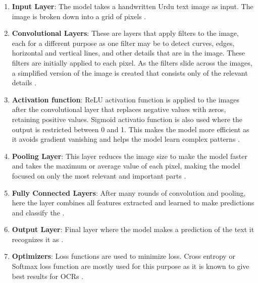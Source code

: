 \documentclass[11pt,twocolumn,twoside]{article} %
\begin{document}
\begin{enumerate}
    \item \textbf{Input Layer}: The model takes a handwritten Urdu text image as input. The image is broken down into a grid of pixels  \cite{alzubaidi2021review}.
    
    \item \textbf{Convolutional Layers}: These are layers that apply filters to the image, each for a different purpose as one filter may be to detect curves, edges, horizontal and vertical lines, and other details that are in the image. These filters are initially applied to each pixel. As the filters slide across the images, a simplified version of the image is created that consists only of the relevant details  \cite{alzubaidi2021review}.
    
    \item \textbf{Activation function}: ReLU activation function is applied to the images after the convolutional layer that replaces negative values with zeros, retaining positive values. Sigmoid activatio function is also used where the output is restricted between 0 and 1. This makes the model more efficient as it avoids gradient vanishing and helps the model learn complex patterns  \cite{alzubaidi2021review}.
    
    \item \textbf{Pooling Layer}: This layer reduces the image size to make the model faster and takes the maximum or average value of each pixel, making the model focused on only the most relevant and important parts  \cite{alzubaidi2021review}.
    
    \item \textbf{Fully Connected Layers}: After many rounds of convolution and pooling, here the layer combines all features extracted and learned to make predictions and classify the \cite{alzubaidi2021review}.
    
    \item \textbf{Output Layer}: Final layer where the model makes a prediction of the text it recognizes it as  \cite{alzubaidi2021review}.
    
    \item \textbf{Optimizers}: Loss functions are used to minimize loss. Cross entropy or Softmax loss function are mostly used for this purpose as it is known to give best results for OCRs  \cite{alzubaidi2021review}.
\end{enumerate}

\cite{rizvi2018ocr} %
\cite{mahdi2024ocr} %
\end{document}
